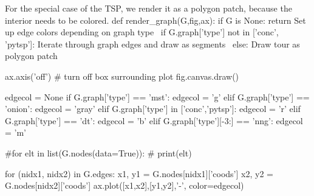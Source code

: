 For the special case of the TSP, we render it as a polygon patch, because the interior
needs to be colored. 
\nwenddocs{}\plusendmoddef\nwstartdeflinemarkup{}\nwenddeflinemarkup
def render_graph(G,fig,ax):
     if G is None:
            return
     \LA{}Set up edge colors depending on graph type~{\nwtagstyle{}}\RA{}
     if G.graph['type'] not in ['conc', 'pytsp']:
          \LA{}Iterate through graph edges and draw as segments~{\nwtagstyle{}}\RA{}
     else:
          \LA{}Draw tour as polygon patch~{\nwtagstyle{}}\RA{}
          
     ax.axis('off') # turn off box surrounding plot
     fig.canvas.draw()
\nwendcode{}\nwdocspar

\nwenddocs{}\endmoddef\nwstartdeflinemarkup{}\nwenddeflinemarkup
edgecol = None
if G.graph['type'] == 'mst':
     edgecol = 'g'
elif G.graph['type'] == 'onion':
     edgecol = 'gray'
elif G.graph['type'] in ['conc','pytsp']:
     edgecol = 'r'
elif G.graph['type'] == 'dt':
     edgecol = 'b'
elif G.graph['type'][-3:] == 'nng':
     edgecol = 'm'
\nwendcode{}\nwdocspar


\nwenddocs{}\endmoddef\nwstartdeflinemarkup{}\nwenddeflinemarkup

#for elt in list(G.nodes(data=True)):
#     print(elt)

for  (nidx1, nidx2) in G.edges:
    x1, y1 = G.nodes[nidx1]['coods']
    x2, y2 = G.nodes[nidx2]['coods']
    ax.plot([x1,x2],[y1,y2],'-', color=edgecol)
\nwendcode{}\nwdocspar


